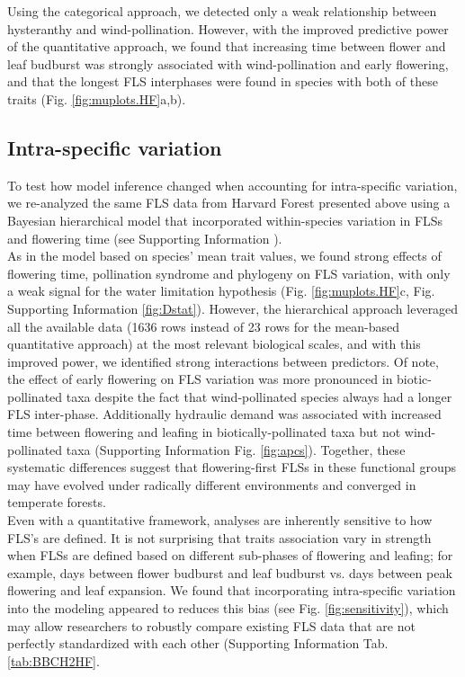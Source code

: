 \documentclass[11pt]{article}
\begin{document}
{\noindent Using the categorical approach, we detected only a weak relationship between hysteranthy and wind-pollination. However, with the improved predictive power of the quantitative approach, we found that increasing time between flower and leaf budburst was strongly associated with wind-pollination and early flowering, and that the longest FLS interphases were found in species with both of these traits (Fig. \ref{fig:muplots.HF}a,b).\\

\subsection*{Intra-specific variation}
\noindent To test how model inference changed when accounting for intra-specific variation, we re-analyzed the same FLS data from Harvard Forest presented above using a Bayesian hierarchical model that incorporated within-species variation in FLSs and flowering time (see Supporting Information ).\\

\noindent As in the model based on species' mean trait values, we found strong effects of flowering time, pollination syndrome and phylogeny on FLS variation, with only a weak signal for the water limitation  hypothesis (Fig. \ref{fig:muplots.HF}c, Fig. Supporting Information \ref{fig:Dstat}). However, the hierarchical approach leveraged all the available data (1636 rows instead of 23 rows for the mean-based quantitative approach) at the most relevant biological scales, and with this improved power, we identified strong interactions between predictors. Of note, the effect of early flowering on FLS variation was more pronounced in biotic-pollinated taxa despite the fact that wind-pollinated species always had a longer FLS inter-phase. Additionally hydraulic demand  was associated with increased time between flowering and leafing in biotically-pollinated taxa but not wind-pollinated taxa (Supporting Information Fig. \ref{fig:apcs}). Together, these systematic differences suggest that flowering-first FLSs in these functional groups may have evolved under radically different environments and converged in temperate forests.\\

\noindent Even with a quantitative framework, analyses are inherently sensitive to how FLS's are defined. It is not surprising that traits association vary in strength when FLSs are defined based on different sub-phases of flowering and leafing; for example, days between flower budburst and leaf budburst vs. days between peak flowering and leaf expansion. We found that incorporating intra-specific variation into the modeling appeared to reduces this bias (see Fig. \ref{fig:sensitivity}), which may allow researchers to robustly compare existing FLS data  that are not perfectly standardized with each other (Supporting Information Tab. \ref{tab:BBCH2HF}.\\

}
\end{document}
